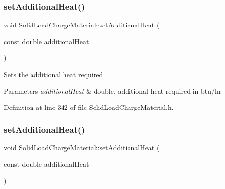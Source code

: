 \mbox{\label{class_solid_load_charge_material_a849fd29a3ecb95be2e9d34f9280b1b94}} 
\subsubsection{\texorpdfstring{set\+Additional\+Heat()}{setAdditionalHeat()}\hspace{0.1cm}{\footnotesize\ttfamily [1/3]}}
{\footnotesize\ttfamily void Solid\+Load\+Charge\+Material\+::set\+Additional\+Heat (\begin{DoxyParamCaption}\item[{const double}]{additional\+Heat }\end{DoxyParamCaption})\hspace{0.3cm}{\ttfamily [inline]}}

Sets the additional heat required 
\begin{DoxyParams}{Parameters}
{\em additional\+Heat} & double, additional heat required in btu/hr \\
\hline
\end{DoxyParams}


Definition at line 342 of file Solid\+Load\+Charge\+Material.\+h.

\mbox{\label{class_solid_load_charge_material_a849fd29a3ecb95be2e9d34f9280b1b94}} 
\subsubsection{\texorpdfstring{set\+Additional\+Heat()}{setAdditionalHeat()}\hspace{0.1cm}{\footnotesize\ttfamily [2/3]}}
{\footnotesize\ttfamily void Solid\+Load\+Charge\+Material\+::set\+Additional\+Heat (\begin{DoxyParamCaption}\item[{const double}]{additional\+Heat }\end{DoxyParamCaption})\hspace{0.3cm}{\ttfamily [inline]}}

